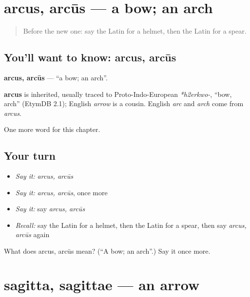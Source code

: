 \section[arcus, arcūs]{arcus, arcūs — a bow; an arch}

\label{lesson:LA-C277-arcus}



\begin{quote}
Before the new one: say the Latin for a helmet, then the Latin for a spear.
\end{quote}

\subsection*{You'll want to know: arcus, arcūs}
\textbf{arcus, arcūs} — \textquotedblleft{}a bow; an arch\textquotedblright{}.

\begin{cousinweb}
\textbf{arcus} is inherited, usually traced to Proto-Indo-European \emph{*h2erkwo-}, \textquotedblleft{}bow, arch\textquotedblright{} (EtymDB 2.1); English \emph{arrow} is a cousin. English \emph{arc} and \emph{arch} come from \emph{arcus}.
\end{cousinweb}

\begin{grammarlens}[title={What you've built}]
One more word for this chapter.
\end{grammarlens}

\subsection*{Your turn}
\begin{itemize}
\raggedright
  \item \emph{Say it:} \emph{arcus, arcūs}
  \item \emph{Say it:} \emph{arcus, arcūs}, once more
  \item \emph{Say it:} say \emph{arcus, arcūs}
  \item \emph{Recall:} say the Latin for a helmet, then the Latin for a spear, then say \emph{arcus, arcūs} again
\end{itemize}

\begin{tcolorbox}[breakable,colback=teal!4,colframe=teal!35!black,title={Before you move on}]
What does arcus, arcūs mean? (\textquotedblleft{}A bow; an arch\textquotedblright{}.) Say it once more.
\end{tcolorbox}
\section[sagitta, sagittae]{sagitta, sagittae — an arrow}

